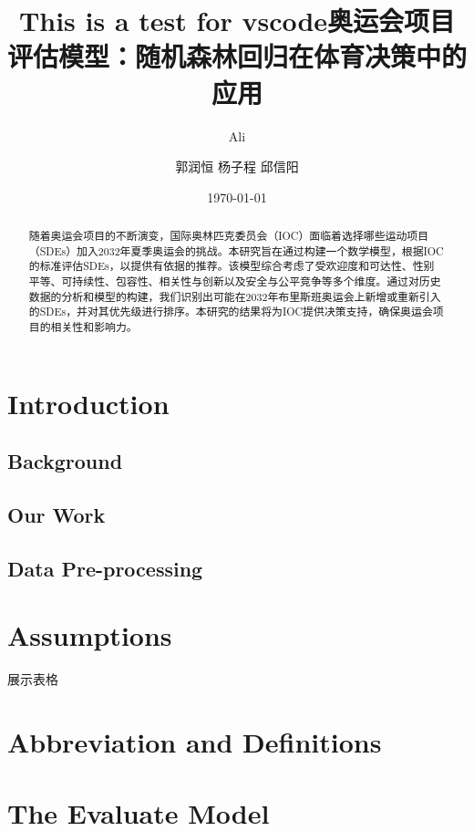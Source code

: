 \documentclass[a4paper]{article}
\title{ This is a test for vscode}
\author{ Ali}
\title{奥运会项目评估模型：随机森林回归在体育决策中的应用}
\author{ 郭润恒 杨子程 邱信阳}
\date{\today}
\begin{document}
    \maketitle


\begin{abstract}
    随着奥运会项目的不断演变，国际奥林匹克委员会（IOC）面临着选择哪些运动项目（SDEs）加入2032年夏季奥运会的挑战。本研究旨在通过构建一个数学模型，根据IOC的标准评估SDEs，以提供有依据的推荐。该模型综合考虑了受欢迎度和可达性、性别平等、可持续性、包容性、相关性与创新以及安全与公平竞争等多个维度。通过对历史数据的分析和模型的构建，我们识别出可能在2032年布里斯班奥运会上新增或重新引入的SDEs，并对其优先级进行排序。本研究的结果将为IOC提供决策支持，确保奥运会项目的相关性和影响力。
\end{abstract}
\tableofcontents
\section{Introduction}
\subsection{Background}     
\subsection{Our Work}
\subsection{Data Pre-processing}


\section{Assumptions}

展示表格

\section{Abbreviation and Definitions}
\section{The Evaluate Model}
\end{document}
